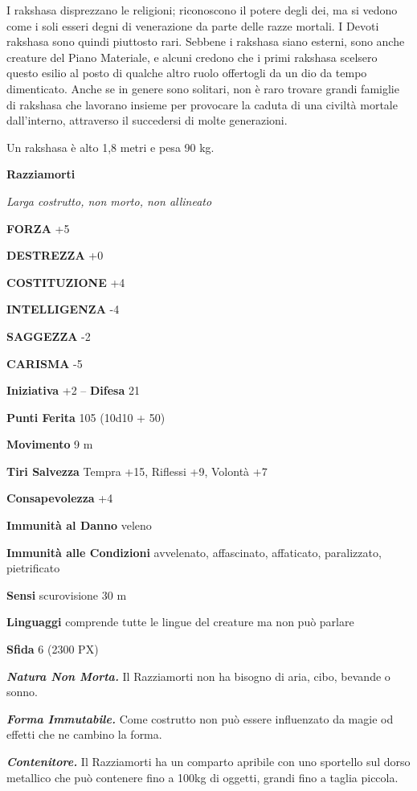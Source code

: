 \begin{multicols}{2}
	I rakshasa disprezzano le religioni; riconoscono il potere degli dei, ma si vedono come i soli esseri degni di venerazione da parte delle razze mortali. I Devoti rakshasa sono quindi piuttosto rari. Sebbene i rakshasa siano esterni, sono anche creature del Piano Materiale, e alcuni credono che i primi rakshasa scelsero questo esilio al posto di qualche altro ruolo offertogli da un dio da tempo dimenticato. Anche se in genere sono solitari, non è raro trovare grandi famiglie di rakshasa che lavorano insieme per provocare la caduta di una civiltà mortale dall'interno, attraverso il succedersi di molte generazioni.

	Un rakshasa è alto 1,8 metri e pesa 90 kg.

	\medskip{}\textbf{Razziamorti}

	\textit{Larga costrutto, non morto, non allineato}

	\textbf{FORZA} +5

	\textbf{DESTREZZA} +0

	\textbf{COSTITUZIONE} +4

	\textbf{INTELLIGENZA} -4

	\textbf{SAGGEZZA} -2

	\textbf{CARISMA} -5

	\textbf{Iniziativa} +2 -- \textbf{Difesa} 21

	\textbf{Punti Ferita} 105 (10d10 + 50)

	\textbf{Movimento} 9 m

	\textbf{Tiri Salvezza} Tempra +15, Riflessi +9, Volontà +7

	\textbf{Consapevolezza} +4

	\textbf{Immunità al Danno} veleno

	\textbf{Immunità alle Condizioni} avvelenato, affascinato, affaticato, paralizzato, pietrificato

	\textbf{Sensi} scurovisione 30 m

	\textbf{Linguaggi} comprende tutte le lingue del creature ma non può parlare

	\textbf{Sfida} 6 (2300 PX)

	\textit{\textbf{Natura Non Morta.}} Il Razziamorti non ha bisogno di aria, cibo, bevande o sonno.

	\textit{\textbf{Forma Immutabile.}} Come costrutto non può essere influenzato da magie od effetti che ne cambino la forma.

	\textit{\textbf{Contenitore.}} Il Razziamorti ha un comparto apribile con uno sportello sul dorso metallico che può contenere fino a 100kg di oggetti, grandi fino a taglia piccola.


\end{multicols}
